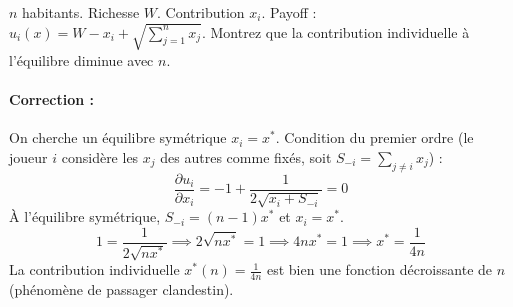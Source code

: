 \begin{exemple}
$n$ habitants. Richesse $W$. Contribution $x_i$. Payoff : $u_i(x) = W - x_i + \sqrt{\sum_{j=1}^n x_j}$. Montrez que la contribution individuelle à l'équilibre diminue avec $n$.

\paragraph{Correction :}
On cherche un équilibre symétrique $x_i = x^*$.
Condition du premier ordre (le joueur $i$ considère les $x_j$ des autres comme fixés, soit $S_{-i} = \sum_{j \ne i} x_j$) :
$$ \frac{\partial u_i}{\partial x_i} = -1 + \frac{1}{2\sqrt{x_i + S_{-i}}} = 0 $$
À l'équilibre symétrique, $S_{-i} = (n-1)x^*$ et $x_i = x^*$.
$$ 1 = \frac{1}{2\sqrt{n x^*}} \implies 2\sqrt{n x^*} = 1 \implies 4n x^* = 1 \implies x^* = \frac{1}{4n} $$
La contribution individuelle $x^*(n) = \frac{1}{4n}$ est bien une fonction décroissante de $n$ (phénomène de passager clandestin).
\end{exemple}
